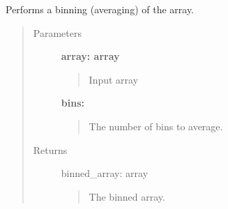 \documentclass[letterpaper,10pt,english]{sphinxmanual}
\begin{document}
\begin{fulllineitems}
\label{pre_processing:pre_processing.bin_array}
Performs a binning (averaging) of the array.
\begin{quote}\begin{description}
\item[{Parameters}] \leavevmode
\textbf{array: array}
\begin{quote}

Input array
\end{quote}

\textbf{bins:}
\begin{quote}

The number of bins to average.
\end{quote}

\item[{Returns}] \leavevmode
binned\_array: array
\begin{quote}

The binned array.
\end{quote}

\end{description}\end{quote}

\end{fulllineitems}

\end{document}
